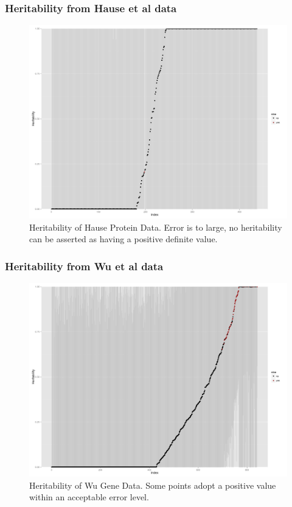 \documentclass{beamer}
\begin{document}
  \begin{frame}
    \frametitle{Heritability from Hause et al data}
    \begin{center}
      \begin{figure}
      \includegraphics[scale=0.2]{../Out/reml_results_hause.png}
      \caption{Heritability of Hause Protein Data. Error is to large, no heritability can be asserted as having a positive definite value.}
      \end{figure}
    \end{center}
  \end{frame}
  
  \begin{frame}
    \frametitle{Heritability from Wu et al data}
    \begin{center}
      \begin{figure}
      \includegraphics[scale=0.2]{../Out/reml_results_wu.png}
      \caption{Heritability of Wu Gene Data. Some points adopt a positive value within an acceptable error level.}
      \end{figure}
    \end{center}
  \end{frame}
  
\end{document}
